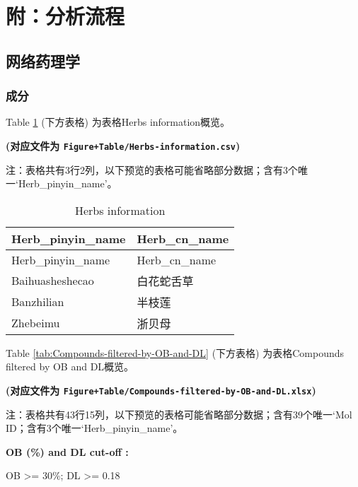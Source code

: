 \documentclass[
]{article}
\begin{document}
\hypertarget{workflow}{%
\section{附：分析流程}\label{workflow}}

\hypertarget{ux7f51ux7edcux836fux7406ux5b66}{%
\subsection{网络药理学}\label{ux7f51ux7edcux836fux7406ux5b66}}

\hypertarget{ux6210ux5206}{%
\subsubsection{成分}\label{ux6210ux5206}}

Table \ref{tab:Herbs-information} (下方表格) 为表格Herbs information概览。

\textbf{(对应文件为 \texttt{Figure+Table/Herbs-information.csv})}

\begin{center}\begin{tcolorbox}[colback=gray!10, colframe=gray!50, width=0.9\linewidth, arc=1mm, boxrule=0.5pt]注：表格共有3行2列，以下预览的表格可能省略部分数据；含有3个唯一`Herb\_pinyin\_name'。
\end{tcolorbox}
\end{center}

\begin{longtable}[]{@{}ll@{}}
\caption{\label{tab:Herbs-information}Herbs information}\tabularnewline
\toprule
Herb\_pinyin\_name & Herb\_cn\_name\tabularnewline
\midrule
\endfirsthead
\toprule
Herb\_pinyin\_name & Herb\_cn\_name\tabularnewline
\midrule
\endhead
Baihuasheshecao & 白花蛇舌草\tabularnewline
Banzhilian & 半枝莲\tabularnewline
Zhebeimu & 浙贝母\tabularnewline
\bottomrule
\end{longtable}

Table \ref{tab:Compounds-filtered-by-OB-and-DL} (下方表格) 为表格Compounds filtered by OB and DL概览。

\textbf{(对应文件为 \texttt{Figure+Table/Compounds-filtered-by-OB-and-DL.xlsx})}

\begin{center}\begin{tcolorbox}[colback=gray!10, colframe=gray!50, width=0.9\linewidth, arc=1mm, boxrule=0.5pt]注：表格共有43行15列，以下预览的表格可能省略部分数据；含有39个唯一`Mol ID；含有3个唯一`Herb\_pinyin\_name'。
\end{tcolorbox}
\end{center}\begin{center}\begin{tcolorbox}[colback=gray!10, colframe=gray!50, width=0.9\linewidth, arc=1mm, boxrule=0.5pt]
\textbf{
OB (\%) and DL cut-off
:}

\vspace{0.5em}

    OB >= 30\%; DL >= 0.18

\vspace{2em}
\end{tcolorbox}
\end{center}
\end{document}
